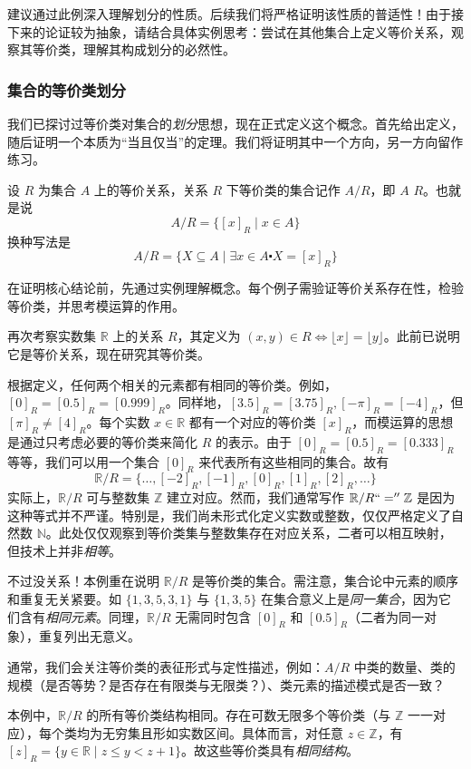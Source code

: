 建议通过此例深入理解划分的性质。后续我们将严格证明该性质的普适性！由于接下来的论证较为抽象，请结合具体实例思考：尝试在其他集合上定义等价关系，观察其等价类，理解其构成划分的必然性。

\subsubsection*{集合的等价类划分}

我们已探讨过等价类对集合的\emph{划分}思想，现在正式定义这个概念。首先给出定义，随后证明一个本质为``当且仅当''的定理。我们将证明其中一个方向，另一方向留作练习。

\begin{definition}
    设 $R$ 为集合 $A$ 上的等价关系，关系 $R$ 下等价类的集合记作 $A / R$，即 $A$  $R$。也就是说
    \[A / R = \{[x]_R \mid x \in A\}\]
    换种写法是
    \[A / R = \{X \subseteq A \mid \exists x \in A \centerdot X = [x]_R\}\]
\end{definition}

在证明核心结论前，先通过实例理解概念。每个例子需验证等价关系存在性，检验等价类，并思考模运算的作用。

\begin{example}
    再次考察实数集 $\mathbb{R}$ 上的关系 $R$，其定义为 $(x, y) \in R \iff \lfloor x \rfloor = \lfloor y \rfloor$。此前已说明它是等价关系，现在研究其等价类。

    根据定义，任何两个相关的元素都有相同的等价类。例如，$[0]_R = [0.5]_R = [0.999]_R$。同样地，$[3.5]_R = [3.75]_R, [-\pi]_R = [-4]_R$，但 $[\pi]_R \ne [4]_R$。每个实数 $x \in \mathbb{R}$ 都有一个对应的等价类 $[x]_R$，而模运算的思想是通过只考虑必要的等价类来简化 $R$ 的表示。由于 $[0]_R = [0.5]_R = [0.333]_R$ 等等，我们可以用一个集合 $[0]_R$ 来代表所有这些相同的集合。故有
    \[\mathbb{R} / R = \{\dots, [-2]_R, [-1]_R, [0]_R, [1]_R, [2]_R, \dots \}\]
    实际上，$\mathbb{R} / R$ 可与整数集 $\mathbb{Z}$ 建立对应。然而，我们通常写作 $\mathbb{R} / R ``='' \mathbb{Z}$ 是因为这种等式并不严谨。特别是，我们尚未形式化定义实数或整数，仅仅严格定义了自然数 $\mathbb{N}$。此处仅仅观察到等价类集与整数集存在对应关系，二者可以相互映射，但技术上并非\emph{相等}。

    不过没关系！本例重在说明 $\mathbb{R} / R$ 是等价类的集合。需注意，集合论中元素的顺序和重复无关紧要。如 $\{1, 3, 5, 3, 1\}$ 与 $\{1, 3, 5\}$ 在集合意义上是\emph{同一集合}，因为它们含有\emph{相同元素}。同理，$\mathbb{R} / R$ 无需同时包含 $[0]_R$ 和 $[0.5]_R$（二者为同一对象），重复列出无意义。

    通常，我们会关注等价类的表征形式与定性描述，例如：$A/R$ 中类的数量、类的规模（是否等势？是否存在有限类与无限类？）、类元素的描述模式是否一致？

    本例中，$\mathbb{R} / R$ 的所有等价类结构相同。存在可数无限多个等价类（与 $\mathbb{Z}$ 一一对应），每个类均为无穷集且形如实数区间。具体而言，对任意 $z \in \mathbb{Z}$，有 $[z]_R = \{y \in \mathbb{R} \mid z \le y < z + 1\}$。故这些等价类具有\emph{相同结构}。
\end{example}

